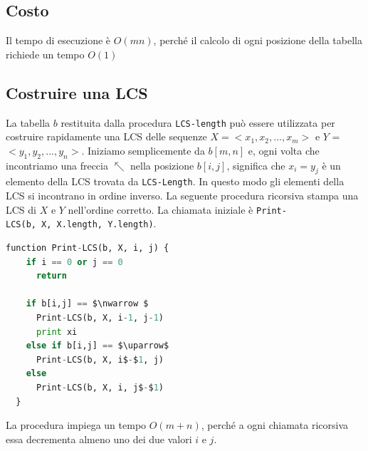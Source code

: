 \subsection{Costo}

Il tempo di esecuzione è $O(mn)$, perché il calcolo di ogni posizione
della tabella richiede un tempo $O(1)$

\subsection{Costruire una LCS}

La tabella $b$ restituita dalla procedura \texttt{LCS-length} può
essere utilizzata per costruire rapidamente una LCS delle sequenze
$X = <x_1, x_2, ..., x_m>$ e $Y$ = $<y_1, y_2, ..., y_n>$.
Iniziamo semplicemente da $b[m,n]$ e, ogni volta che incontriamo una
freccia $\nwarrow $ nella posizione $b[i,j]$, significa che $x_i = y_j$ è
un elemento della LCS trovata da \texttt{LCS-Length}. In questo modo gli
elementi della LCS si incontrano in ordine inverso. La seguente
procedura ricorsiva stampa una LCS di $X$ e $Y$ nell'ordine
corretto. La chiamata iniziale è
\texttt{Print-LCS(b,\ X,\ X.length,\ Y.length)}.\\

\begin{minipage}{\textwidth}
  \begin{lstlisting}[language=Python, mathescape=true]
function Print-LCS(b, X, i, j) {
    if i == 0 or j == 0
      return

    if b[i,j] == $\nwarrow $
      Print-LCS(b, X, i-1, j-1)
      print xi
    else if b[i,j] == $\uparrow$
      Print-LCS(b, X, i$-$1, j)
    else
      Print-LCS(b, X, i, j$-$1)
  }
\end{lstlisting}
\end{minipage}

La procedura impiega un tempo $O(m + n)$, perché a ogni chiamata
ricorsiva essa decrementa almeno uno dei due valori $i$ e $j$.
